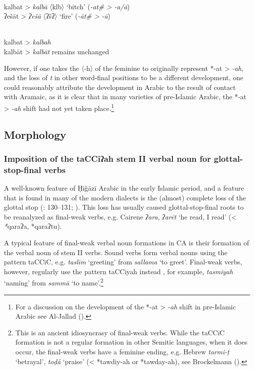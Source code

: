 \documentclass[output=paper]{langsci/langscibook}
\begin{document}
 \\
\ea *kalbat > \textit{kalbā} 〈klb〉 ‘bitch’ (\textit{-at\# > -a/ā})\\
\ex *ʔešāt > \textit{ʔešā}   〈ʔšʔ〉 ‘fire’ (\textit{-āt\# > -ā})\\
\z
\z

 \\
\ea *kalbat > \textit{kalbah}\\
\ex *kalbāt > \textit{kalbāt} remains unchanged \\
\z
\z

However, if one takes the 〈-h〉 of the feminine to originally represent *-at > \textit{-ah}, and the loss of \textit{t} in other word-final positions to be a different development, one could reasonably attribute the development in Arabic to the result of contact with Aramaic, as it is clear that in many varieties of pre-Islamic Arabic, the *-at > \textit{-ah} shift had not yet taken place.\footnote{For a discussion on the development of the *-at > \textit{-ah} shift in pre-Islamic Arabic see Al-Jallad (\citeyear[157--158]{Al-Jallad2017Greek}).}

\subsection{\label{bkm:Ref13577493}Morphology}
\subsubsection{\label{bkm:Ref13224791}Imposition of the taCCiʔah stem II verbal noun for glottal-stop-final verbs}

A well-known feature of Ḥiǧāzī Arabic in the early Islamic period, and a feature that is found in many of the modern dialects is the (almost) complete loss of the glottal stop (\citealt{Rabin1951}: 130--131; \citealt{vanPutten2018}). This loss has usually caused glottal-stop-final roots to be reanalyzed as final-weak verbs, e.g. Cairene \textit{ʔara,} \textit{ʔarēt} ‘he read, I read’ (< \textit{*}qaraʔa, *qaraʔtu).

A typical feature of final-weak verbal noun formations in CA is their formation of the verbal noun of stem II verbs. Sound verbs form verbal nouns using the pattern taCCīC, e.g. \textit{taslīm} ‘greeting’ from \textit{sallama} ‘to greet’. Final-weak verbs, however, regularly use the pattern taCCiyah instead \citep[44]{Fischer2002}, for example, \textit{tasmiyah} ‘naming’ from \textit{sammā} ‘to name’.\footnote{This is an ancient idiosyncrasy of final-weak verbs. While the taCCīC formation is not a regular formation in other Semitic languages, when it does occur, the final-weak verbs have a feminine ending, e.g. Hebrew \textit{tarmi-ṯ} ‘betrayal’, \textit{toḏå} ‘praise’ (< *tawdiy-ah or *tawday-ah), see Brockelmann (\citeyear[385--387]{Brockelmann1908}).} 
\end{document}
